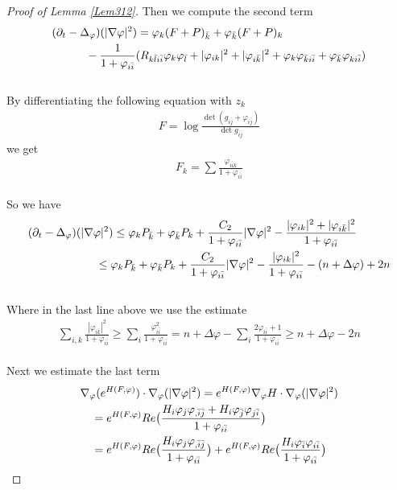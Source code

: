 \documentclass[11pt]{amsart}
\numberwithin{equation}{section}
\begin{document}
\begin{proof}[Proof of Lemma \ref{Lem312}]
Then we compute the second term 
\begin{align}
	&(\partial_t-\Delta_{\varphi})(|\nabla\varphi|^2) = \varphi_k(F+P)_{\bar k}+\varphi_{\bar k}(F+P)_k \notag\\
	&\quad\quad\quad - \frac{1}{1+\varphi_{i\bar i}}(R_{k\bar l i\bar i}\varphi_{k}\varphi_{\bar l}+|\varphi_{ik}|^2+|\varphi_{i\bar k}|^2+\varphi_k\varphi_{\bar k i\bar i}+\varphi_{\bar k}\varphi_{k i\bar i})
\end{align}\\
By differentiating the following equation with $z_k$
	\begin{align}
		F=\log\frac{\det(g_{i\bar j}+\varphi_{i\bar j})}{\det g_{i\bar j}}
	\end{align}
we get 
	\begin{align}
		F_k=\sum\frac{\varphi_{i\bar i k}}{1+\varphi_{i\bar i}}
	\end{align}\\
So we have 
\begin{align}
	& (\partial_t-\Delta_{\varphi})(|\nabla\varphi|^2) \le  \varphi_k P_{\bar k}+\varphi_{\bar k}P_k + \frac{C_2}{1+\varphi_{i\bar i}}|\nabla\varphi|^2 -\frac{|\varphi_{ik}|^2+|\varphi_{i\bar k}|^2}{1+\varphi_{i\bar i}} \notag\\
	&\quad\quad\quad\quad\quad\quad \le  \varphi_k P_{\bar k}+\varphi_{\bar k}P_k + \frac{C_2}{1+\varphi_{i\bar i}}|\nabla\varphi|^2 -\frac{|\varphi_{ik}|^2}{1+\varphi_{i\bar i}} - (n+\Delta\varphi)+2n
\end{align}\\
Where in the last line above we use the estimate
\begin{align}
	\sum_{i,k} \frac{|\varphi_{i\bar k}|^2}{1+\varphi_{i\bar i}} \ge  \sum_i \frac{\varphi_{i\bar i}^2}{1+\varphi_{i\bar i}} = n+\Delta\varphi - \sum_i \frac{2\varphi_{i\bar i}+1}{1+\varphi_{i\bar i}} \ge  n+\Delta\varphi-2n
\end{align} \\
Next we estimate the last term 
\begin{align}
	&\nabla_{\varphi}(e^{H(F,\varphi)})\cdot \nabla_{\varphi}(|\nabla\varphi|^2)=e^{H(F,\varphi)}\nabla_{\varphi}H\cdot \nabla_{\varphi}(|\nabla\varphi|^2) \notag\\
	&\quad =e^{H(F,\varphi)}Re\big(\frac{H_i\varphi_{j}\varphi_{,\bar{i}\bar{j}}+H_i\varphi_{\bar{j}}\varphi_{j\bar{i}}}{1+\varphi_{i\bar{i}}}\big)\\
	&\quad =e^{H(F,\varphi)}Re\big(\frac{H_i\varphi_j\varphi_{,\bar{i}\bar{j}}}{1+\varphi_{i\bar{i}}}\big)+e^{H(F,\varphi)}Re\big(\frac{H_i\varphi_{\bar{i}}\varphi_{i\bar{i}}}{1+\varphi_{i\bar{i}}}\big)

\end{align}
\end{proof}
\end{document}
